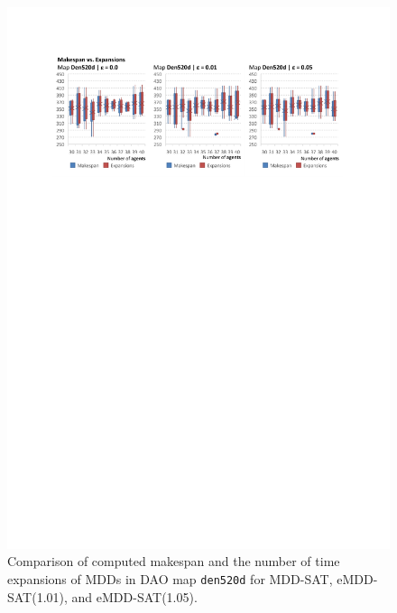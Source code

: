 \documentclass[jair,oneside,11pt]{article}
\begin{document}
\begin{figure}[h]
\centering
\includegraphics[trim={2.5cm 20.8cm 2.5cm 2.5cm},clip,width=1.0\textwidth]{expr_maps-make-expand_den520d.pdf}
\vspace{-0.6cm}\caption{Comparison of computed makespan and the number of time expansions of MDDs in DAO map \texttt{den520d} for MDD-SAT, eMDD-SAT(1.01), and eMDD-SAT(1.05).}
\label{figure-make-expand-maps_den520d}
\end{figure}
\end{document}
